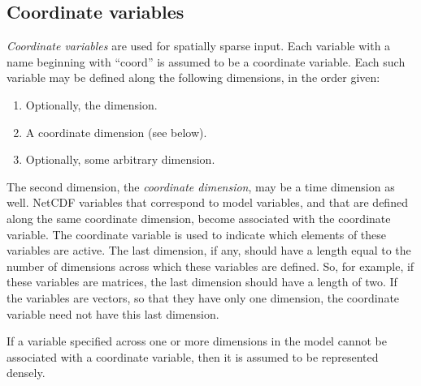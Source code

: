 \subsection{Coordinate variables\label{Coordinate_variables}}

\emph{Coordinate variables} are used for spatially sparse input. Each variable
with a name beginning with ``coord'' is assumed to be a coordinate
variable. Each such variable may be defined along the following dimensions, in
the order given:
\begin{enumerate}
\item Optionally, the  dimension.
\item A coordinate dimension (see below).
\item Optionally, some arbitrary dimension.
\end{enumerate}
The second dimension, the \emph{coordinate
  dimension}, may be a time dimension as
well. NetCDF variables that correspond to model variables, and that are
defined along the same coordinate dimension, become associated with the
coordinate variable. The coordinate variable is used to indicate which
elements of these variables are active. The last dimension, if any, should
have a length equal to the number of dimensions across which these variables
are defined. So, for example, if these variables are matrices, the last
dimension should have a length of two. If the variables are vectors, so that
they have only one dimension, the coordinate variable need not have this last
dimension.


If a variable specified across one or more dimensions in the model cannot be
associated with a coordinate variable, then it is assumed to be represented
densely.

